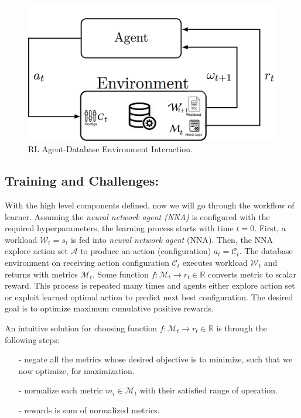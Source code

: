 \begin{figure}[h]
  \vspace{-3mm}
	\includegraphics[width=\linewidth ]{fig/database_agent.png}
    \vspace{-5mm}
    \caption{RL Agent-Database Environment Interaction.}
    \label{fig:database_agent}
    \vspace{-5mm}
\end{figure}


\subsection*{Training and Challenges:}
With the high level components defined, now we will go through the workflow of learner.
Assuming the {\em neural network agent (NNA) } is configured with the required hyperparameters, the learning process starts with time $t=0$.
First, a workload $\mathcal{W}_t = s_t$  is fed into {\em neural network agent} (NNA). Then, the NNA explore action set $\mathcal{A}$ to produce an action (configuration) $a_t = \mathcal{C}_t$. The database environment on receiving action configuration $\mathcal{C}_t$ executes workload $\mathcal{W}_t$ and returns with metrics $\mathcal{M}_t$. Some function $f: \mathcal{M}_t \rightarrow r_t \in \mathbb{R}$ converts metric to scalar reward. This process is repeated many times and agents either explore action set or exploit learned optimal action to predict next best configuration. The desired goal is to optimize maximum cumulative positive rewards.

An intuitive solution for choosing function $f: \mathcal{M}_t \rightarrow r_t \in \mathbb{R}$ is  through the following steps:\\
\vspace{-4mm}
\begin{itemize}
  \item[-] negate all the metrics whose desired objective is to minimize, such that we now optimize, for maximization.
  \item[-] normalize each metric $m_i \in \mathcal{M}_t$ with their satisfied range of operation.
  \item[-] rewards is sum  of normalized metrics.
\end{itemize}

